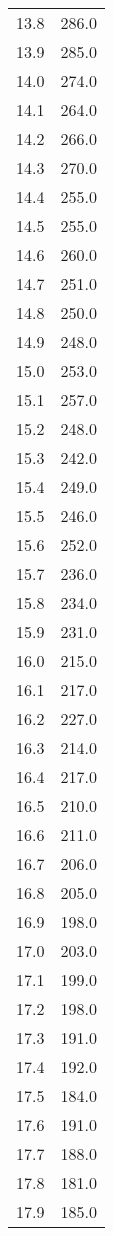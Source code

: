 \begin{table}
\begin{tabular}{c c}
        13.8	&	286.0\\
        13.9	&	285.0\\
        14.0	&	274.0\\
        14.1	&	264.0\\
        14.2	&	266.0\\
        14.3	&	270.0\\
        14.4	&	255.0\\
        14.5	&	255.0\\
        14.6	&	260.0\\
        14.7	&	251.0\\
        14.8	&	250.0\\
        14.9	&	248.0\\
        15.0	&	253.0\\
        15.1	&	257.0\\
        15.2	&	248.0\\
        15.3	&	242.0\\
        15.4	&	249.0\\
        15.5	&	246.0\\
        15.6	&	252.0\\
        15.7	&	236.0\\
        15.8	&	234.0\\
        15.9	&	231.0\\
        16.0	&	215.0\\
        16.1	&	217.0\\
        16.2	&	227.0\\
        16.3	&	214.0\\
        16.4	&	217.0\\
        16.5	&	210.0\\
        16.6	&	211.0\\
        16.7	&	206.0\\
        16.8	&	205.0\\
        16.9	&	198.0\\
        17.0	&	203.0\\
        17.1	&	199.0\\
        17.2	&	198.0\\
        17.3	&	191.0\\
        17.4	&	192.0\\
        17.5	&	184.0\\
        17.6	&	191.0\\
        17.7	&	188.0\\
        17.8	&	181.0\\
        17.9	&	185.0\\

\end{tabular}
\end{table}
